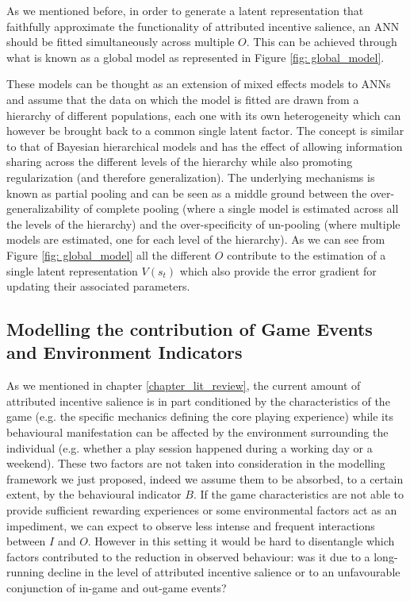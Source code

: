 

As we mentioned before, in order to generate a latent representation that faithfully approximate the functionality of attributed incentive salience, an ANN should be fitted simultaneously across multiple $O$. This can be achieved through what is known as a global model \cite{wang2019deep} as represented in Figure \ref{fig: global_model}.



These models can be thought as an extension of mixed effects models \cite{crawley2007mixed} to ANNs and assume that the data on which the model is fitted are drawn from a hierarchy of different populations, each one with its own heterogeneity which can however be brought back to a common single latent factor. The concept is similar to that of Bayesian hierarchical models \cite{gelman2020bayesian} and has the effect of allowing information sharing across the different levels of the hierarchy while also promoting regularization (and therefore generalization)\cite{gelman2020bayesian}. The underlying mechanisms is known as partial pooling \cite{gelman2020bayesian} and can be seen as a middle ground between the over-generalizability of complete pooling (where a single model is estimated across all the levels of the hierarchy) and the over-specificity of un-pooling (where multiple models are estimated, one for each level of the hierarchy). As we can see from Figure \ref{fig: global_model} all the different $O$ contribute to the estimation of a single latent representation $V(s_t)$ which also provide the error gradient for updating their associated parameters.

\subsection{Modelling the contribution of Game Events and Environment Indicators}
\label{modelling_env_and_game_elements}
As we mentioned in chapter \ref{chapter_lit_review}, the current amount of attributed incentive salience is in part conditioned by the characteristics of the game (e.g. the specific mechanics defining the core playing experience) while its behavioural manifestation can be affected by the environment surrounding the individual (e.g. whether a play session happened during a working day or a weekend). These two factors are not taken into consideration in the modelling framework we just proposed, indeed we assume them to be absorbed, to a certain extent, by the behavioural indicator $B$. If the game characteristics are not able to provide sufficient rewarding experiences or some environmental factors act as an impediment, we can expect to observe less intense and frequent interactions between $I$ and $O$. However in this setting it would be hard to disentangle which factors contributed to the reduction in observed behaviour: was it due to a long-running decline in the level of attributed incentive salience or to an unfavourable conjunction of in-game and out-game events? 


